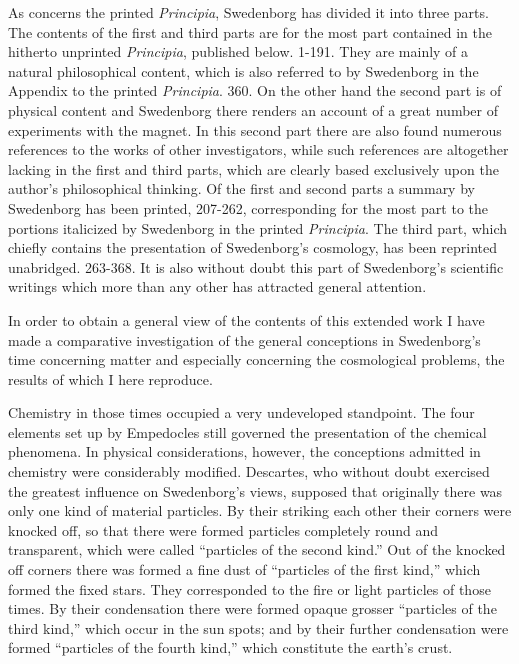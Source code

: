 \documentclass[a4paper, 11pt, oneside, polutonikogreek, english]{article}
\begin{document}
As concerns the printed \emph{Principia}, Swedenborg has divided it into three parts. The contents of the first and third parts are for the most part contained in the hitherto unprinted \emph{Principia}, published below. 1-191. They are mainly of a natural philosophical content, which is also referred to by Swedenborg in the Appendix to the printed \emph{Principia}. 360. On the other hand the second part is of physical content and Swedenborg there renders an account of a great number of experiments with the magnet. In this second part there are also found numerous references to the works of other investigators, while such references are altogether lacking in the first and third parts, which are clearly based exclusively upon the author's philosophical thinking. Of the first and second parts a summary by Swedenborg has been printed, 207-262, corresponding for the most part to the portions italicized by Swedenborg in the printed \emph{Principia}. The third part, which chiefly contains the presentation of Swedenborg's cosmology, has been reprinted unabridged. 263-368. It is also without doubt this part of Swedenborg's scientific writings which more than any other has attracted general attention.

In order to obtain a general view of the contents of this extended work I have made a comparative investigation of the general conceptions in Swedenborg's time concerning matter and especially concerning the cosmological problems, the results of which I here reproduce.

Chemistry in those times occupied a very undeveloped standpoint. The four elements set up by Empedocles still governed the presentation of the chemical phenomena. In physical considerations, however, the conceptions admitted in chemistry were considerably modified. Descartes, who without doubt exercised the greatest influence on Swedenborg's views, supposed that originally there was only one kind of material particles. By their striking each other their corners were knocked off, so that there were formed particles completely round and transparent, which were called ``particles of the second kind.'' Out of the knocked off corners there was formed a fine dust of ``particles of the first kind,'' which formed the fixed stars. They corresponded to the fire or light particles of those times. By their condensation there were formed opaque grosser ``particles of the third kind,'' which occur in the sun spots; and by their further condensation were formed ``particles of the fourth kind,'' which constitute the earth's crust.
\end{document}

